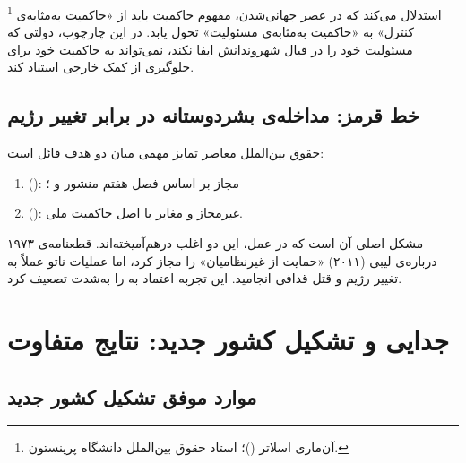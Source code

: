 %
\footnote{%
	آن‌ماری اسلاتر ()؛%
	استاد حقوق بین‌الملل دانشگاه پرینستون.%
}%
استدلال می‌کند که در عصر جهانی‌شدن، مفهوم حاکمیت باید از
«حاکمیت به‌مثابه‌ی کنترل» به «حاکمیت به‌مثابه‌ی مسئولیت»
تحول یابد.
در این چارچوب، دولتی که مسئولیت خود را در قبال شهروندانش ایفا
نکند، نمی‌تواند به حاکمیت خود برای جلوگیری از کمک خارجی
استناد کند.

\subsection{خط قرمز: مداخله‌ی بشردوستانه در برابر تغییر رژیم}
\label{subsec:ch03-regime-change}

\begin{tcolorbox}[legalbox,
	title={تمایز حقوقی: حمایت از غیرنظامیان و تغییر رژیم}]
	حقوق بین‌الملل معاصر تمایز مهمی میان دو هدف قائل است:
	\begin{enumerate}[label=\textbf{\alph*.}, nosep, rightmargin=1em]
		\item {}
		(): مجاز بر اساس فصل هفتم
		منشور و ؛
		\item {}
		(): غیرمجاز و مغایر با اصل حاکمیت
		ملی.
	\end{enumerate}
	
	مشکل اصلی آن است که در عمل، این دو اغلب درهم‌آمیخته‌اند.
	قطعنامه‌ی ۱۹۷۳ درباره‌ی لیبی (۲۰۱۱) «حمایت از غیرنظامیان» را
	مجاز کرد، اما عملیات ناتو عملاً به تغییر رژیم و قتل قذافی
	انجامید. این تجربه اعتماد به  را به‌شدت تضعیف
	کرد.
\end{tcolorbox}


\section{جدایی و تشکیل کشور جدید: نتایج متفاوت}
\label{sec:ch03-new-states}

\subsection{موارد موفق تشکیل کشور جدید}
\label{subsec:ch03-success}


